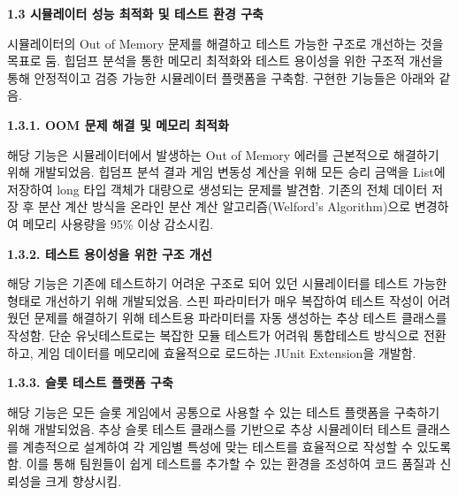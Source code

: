 \documentclass[letterpaper,11pt]{article}
\newcommand{\resumeSubProject}[2]{
  \item{
    {#1 \vspace{0pt}}
    {#2}
  }
}
\begin{document}
{{        \vspace{7mm}

        }

        \resumeSubProject{\textbf{1.3 시뮬레이터 성능 최적화 및 테스트 환경 구축}}
        
       {
        시뮬레이터의 Out of Memory 문제를 해결하고 테스트 가능한 구조로 개선하는 것을 목표로 둠. 힙덤프 분석을 통한 메모리 최적화와 테스트 용이성을 위한 구조적 개선을 통해 안정적이고 검증 가능한 시뮬레이터 플랫폼을 구축함. 구현한 기능들은 아래와 같음. 
        
        \vspace{2mm}
        
        \textbf{1.3.1. OOM 문제 해결 및 메모리 최적화}
        
        해당 기능은 시뮬레이터에서 발생하는 Out of Memory 에러를 근본적으로 해결하기 위해 개발되었음. 힙덤프 분석 결과 게임 변동성 계산을 위해 모든 승리 금액을 List에 저장하여 long 타입 객체가 대량으로 생성되는 문제를 발견함. 기존의 전체 데이터 저장 후 분산 계산 방식을 온라인 분산 계산 알고리즘(Welford's Algorithm)으로 변경하여 메모리 사용량을 95\% 이상 감소시킴.
        
        \vspace{2mm}
        
        \textbf{1.3.2. 테스트 용이성을 위한 구조 개선}
        
        해당 기능은 기존에 테스트하기 어려운 구조로 되어 있던 시뮬레이터를 테스트 가능한 형태로 개선하기 위해 개발되었음. 스핀 파라미터가 매우 복잡하여 테스트 작성이 어려웠던 문제를 해결하기 위해 테스트용 파라미터를 자동 생성하는 추상 테스트 클래스를 작성함. 단순 유닛테스트로는 복잡한 모듈 테스트가 어려워 통합테스트 방식으로 전환하고, 게임 데이터를 메모리에 효율적으로 로드하는 JUnit Extension을 개발함.

        \vspace{2mm}
        
        \textbf{1.3.3. 슬롯 테스트 플랫폼 구축}

        해당 기능은 모든 슬롯 게임에서 공통으로 사용할 수 있는 테스트 플랫폼을 구축하기 위해 개발되었음. 추상 슬롯 테스트 클래스를 기반으로 추상 시뮬레이터 테스트 클래스를 계층적으로 설계하여 각 게임별 특성에 맞는 테스트를 효율적으로 작성할 수 있도록 함. 이를 통해 팀원들이 쉽게 테스트를 추가할 수 있는 환경을 조성하여 코드 품질과 신뢰성을 크게 향상시킴.
        
        \vspace{7mm}
        }
        
}
\end{document}
